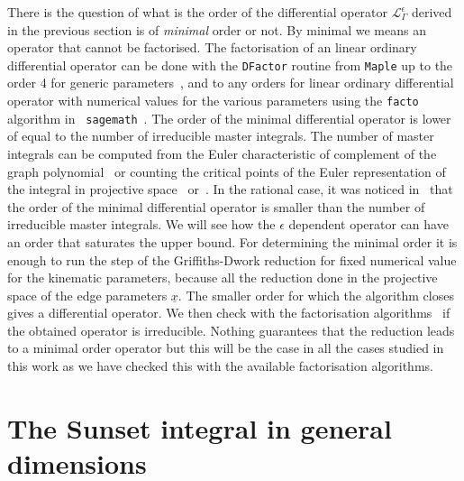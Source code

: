 \documentclass[a4paper,12pt]{article}
\numberwithin{equation}{section}
\numberwithin{figure}{section}
\begin{document}
There is the question of what is the order of the differential
operator  $\mathscr{L}_\Gamma^\epsilon$  derived in the previous
section is of \emph{minimal} order or not.  By minimal we means an
operator that cannot be factorised. The factorisation of an linear ordinary
differential operator can be done with the {\tt DFactor} routine from
{\tt Maple} up to the order 4 for generic parameters~\cite{PutSinger,vanHoeij}, and to any
orders for linear  ordinary
differential operator with numerical values for the various parameters
using the {\tt facto} algorithm in {\tt
  sagemath}~\cite{chyzak2022symbolic,goyer2021sage}.
The order of the minimal differential operator is lower of equal to
the number of irreducible master integrals. The number of master
integrals  can be computed from the Euler
characteristic of complement of the graph polynomial~\cite{Bitoun:2017nre} or counting the
critical points of the Euler representation of the integral in
projective
space~\cite{Lee:2013hzt,Cacciatori:2021nli,Agostini:2022cgv} or~\cite{Mastrolia:2018uzb,Frellesvig:2019uqt}.   In the rational case, it was noticed
in~\cite{Bloch:2013tra,Bloch:2016izu,Bloch:2014qca,Lairez:2022zkj} that the order of the minimal differential operator is
smaller than the number of irreducible master integrals. We will see
how the $\epsilon$ dependent operator can have an order that saturates
the upper bound.
 For
determining the minimal order it is enough to run the step of the
Griffiths-Dwork reduction for fixed numerical value for the kinematic
parameters, because all the reduction done in the projective space of
the edge parameters $\underline x$. The smaller order for which the
algorithm closes gives a differential operator. We then check with the
factorisation algorithms~\cite{chyzak2022symbolic,goyer2021sage} if
the obtained operator is irreducible. Nothing guarantees that the reduction leads to
a minimal order operator but this will be  the case in all the cases
studied in this work as we have checked this with the available
factorisation algorithms.

\section{The Sunset integral in general dimensions}
\end{document}
